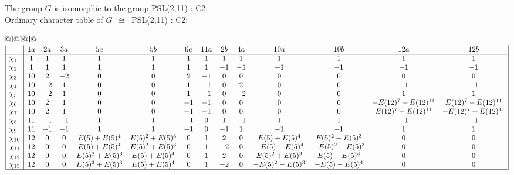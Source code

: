 \documentclass[varwidth=\maxdimen,border=10]{standalone}
\begin{document}
The group $G$ is isomorphic to the group PSL(2,11) : C2.\\
Ordinary character table of $G$\ $\cong$\ PSL(2,11) : C2:\\
\begin{center}
\begin{tabular}{@{}l@{}l@{}l@{}}
\hline
\(\begin{array}{|l|ccccccccccccc|}
  & 1a & 2a & 3a & 5a & 5b & 6a & 11a & 2b & 4a & 10a & 10b & 12a & 12b\\ \hline
\chi_{1} & 1 & 1 & 1 & 1 & 1 & 1 & 1 & 1 & 1 & 1 & 1 & 1 & 1\\
\chi_{2} & 1 & 1 & 1 & 1 & 1 & 1 & 1 & -1 & -1 & -1 & -1 & -1 & -1\\
\chi_{3} & 10 & 2 & -2 & 0 & 0 & 2 & -1 & 0 & 0 & 0 & 0 & 0 & 0\\
\chi_{4} & 10 & -2 & 1 & 0 & 0 & 1 & -1 & 0 & 2 & 0 & 0 & -1 & -1\\
\chi_{5} & 10 & -2 & 1 & 0 & 0 & 1 & -1 & 0 & -2 & 0 & 0 & 1 & 1\\
\chi_{6} & 10 & 2 & 1 & 0 & 0 & -1 & -1 & 0 & 0 & 0 & 0 & -E(12)^{7}+E(12)^{11} & E(12)^{7}-E(12)^{11}\\
\chi_{7} & 10 & 2 & 1 & 0 & 0 & -1 & -1 & 0 & 0 & 0 & 0 & E(12)^{7}-E(12)^{11} & -E(12)^{7}+E(12)^{11}\\
\chi_{8} & 11 & -1 & -1 & 1 & 1 & -1 & 0 & 1 & -1 & 1 & 1 & -1 & -1\\
\chi_{9} & 11 & -1 & -1 & 1 & 1 & -1 & 0 & -1 & 1 & -1 & -1 & 1 & 1\\
\chi_{10} & 12 & 0 & 0 & E(5)+E(5)^{4} & E(5)^{2}+E(5)^{3} & 0 & 1 & 2 & 0 & E(5)+E(5)^{4} & E(5)^{2}+E(5)^{3} & 0 & 0\\
\chi_{11} & 12 & 0 & 0 & E(5)+E(5)^{4} & E(5)^{2}+E(5)^{3} & 0 & 1 & -2 & 0 & -E(5)-E(5)^{4} & -E(5)^{2}-E(5)^{3} & 0 & 0\\
\chi_{12} & 12 & 0 & 0 & E(5)^{2}+E(5)^{3} & E(5)+E(5)^{4} & 0 & 1 & 2 & 0 & E(5)^{2}+E(5)^{3} & E(5)+E(5)^{4} & 0 & 0\\
\chi_{13} & 12 & 0 & 0 & E(5)^{2}+E(5)^{3} & E(5)+E(5)^{4} & 0 & 1 & -2 & 0 & -E(5)^{2}-E(5)^{3} & -E(5)-E(5)^{4} & 0 & 0\\
\hline
\end{array}\)\\
\end{tabular}
\end{center}
\end{document}
